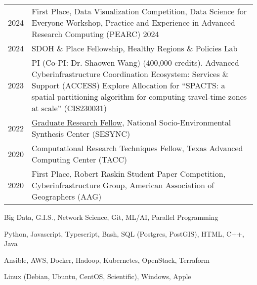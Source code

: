 \documentclass{acmresume}
\begin{document}
        \begin{longtable}{p{0.08\linewidth} p{0.92\linewidth}}

            2024 & First Place, Data Visualization Competition, Data Science for Everyone Workshop, Practice and Experience in Advanced Research Computing (PEARC) 2024 \\
            
            2024 & SDOH \& Place Fellowship, Healthy Regions \& Policies Lab \\
        
            2023 & PI (Co-PI: Dr. Shaowen Wang) (400,000 credits). Advanced Cyberinfrastructure Coordination Ecosystem: Services \& Support (ACCESS) Explore Allocation for “SPACTS: a spatial partitioning algorithm for computing travel-time zones at scale” (CIS230031) \\

    
                    
            2022 & \href{https://www.sesync.org/project/graduate-pursuits-request-for-proposals/financial-opacity-and-challenges-to-forest}{Graduate Research Fellow}, National Socio-Environmental Synthesis Center (SESYNC)\\
    
            2020 & Computational Research Techniques Fellow, Texas Advanced Computing Center (TACC)\\
    
            2020 & First Place, Robert Raskin Student Paper Competition, Cyberinfrastructure Group, American Association of Geographers (AAG) \\
    
        \end{longtable}
    
    
\vspace*{-.25cm}

        \begin{description}[topsep=0pt,itemsep=0pt]
        	 Big Data, G.I.S., Network Science, Git, ML/AI, Parallel Programming
        	
        	\desc[Languages:] Python, Javascript, Typescript, Bash, SQL (Postgres, PostGIS), HTML, C++, Java
        	
        	\desc[Technologies:] Ansible, AWS, Docker, Hadoop, Kubernetes, OpenStack, Terraform
        	
        	 Linux (Debian, Ubuntu, CentOS, Scientific), Windows, Apple
        \end{description}

	
\end{document}
